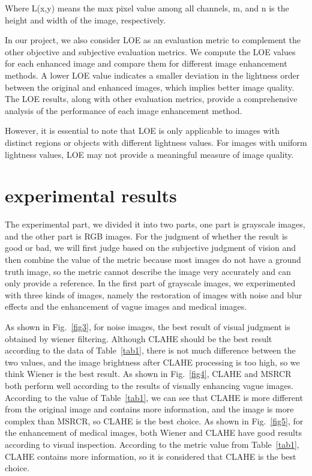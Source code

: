 \documentclass[conference]{IEEEtran}
\begin{document}
Where L(x,y) means the max pixel value among all channels, m, and n is the height and width of the image, respectively.

In our project, we also consider LOE as an evaluation metric to complement the other objective and subjective evaluation metrics. We compute the LOE values for each enhanced image and compare them for different image enhancement methods. A lower LOE value indicates a smaller deviation in the lightness order between the original and enhanced images, which implies better image quality. The LOE results, along with other evaluation metrics, provide a comprehensive analysis of the performance of each image enhancement method. 

However, it is essential to note that LOE is only applicable to images with distinct regions or objects with different lightness values. For images with uniform lightness values, LOE may not provide a meaningful measure of image quality.
\section{experimental results}

The experimental part, we divided it into two parts, one part is grayscale images, and the other part is RGB images. For the judgment of whether the result is good or bad, we will first judge based on the subjective judgment of vision and then combine the value of the metric because most images do not have a ground truth image, so the metric cannot describe the image very accurately and can only provide a reference. In the first part of grayscale images, we experimented with three kinds of images, namely the restoration of images with noise and blur effects and the enhancement of vague images and medical images.

As shown in Fig.~\ref{fig3}, for noise images, the best result of visual judgment is obtained by wiener filtering. Although CLAHE should be the best result according to the data of Table~\ref{tab1}, there is not much difference between the two values, and the image brightness after CLAHE processing is too high, so we think Wiener is the best result. As shown in Fig.~\ref{fig4}, CLAHE and MSRCR both perform well according to the results of visually enhancing vague images. According to the value of Table~\ref{tab1}, we can see that CLAHE is more different from the original image and contains more information, and the image is more complex than MSRCR, so CLAHE is the best choice. As shown in Fig.~\ref{fig5}, for the enhancement of medical images, both Wiener and CLAHE have good results according to visual inspection. According to the metric value from Table~\ref{tab1}, CLAHE contains more information, so it is considered that CLAHE is the best choice.
\end{document}
